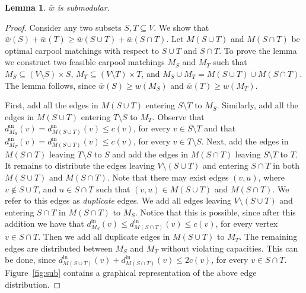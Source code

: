\documentclass[11pt]{article}
\newtheorem{lemma}{Lemma}
\newcommand{\din}[1][M]{d^{\text{in}}_{#1}}
\newcommand{\barw}{\bar{w}}
\begin{document}
\begin{lemma}
$\barw$ is submodular.
\end{lemma}
\begin{proof}
Consider any two subsets $S, T \subseteq V$.  We show that $\barw(S)
+ \barw(T) \geq \barw(S \cup T) + \barw(S \cap T)$.
%
Let $M(S \cup T)$ and $M(S \cap T)$ be optimal carpool matchings with
respect to $S \cup T$ and $S \cap T$.
%
To prove the lemma we construct two feasible carpool matchings $M_S$
and $M_T$ such that $M_S \subseteq (V \setminus S) \times S$,
$M_T \subseteq (V \setminus T) \times T$, and $M_S \cup M_T = M(S \cup
T) \cup M(S \cap T)$.
%
The lemma follows, since $\barw(S) \geq w(M_S)$ and $\barw(T) \geq
w(M_T)$.

First, add all the edges in $M(S \cup T)$ entering $S \setminus T$ to
$M_S$.  Similarly, add all the edges in $M(S \cup T)$ entering
$T \setminus S$ to $M_T$.  Observe that $\din[M_S](v) = \din[M(S \cup
T)](v) \leq c(v)$, for every $v \in S \setminus T$ and that
$\din[M_T](v) = \din[M(S \cup T)](v) \leq c(v)$, for every $v \in
T \setminus S$.
%
Next, add the edges in $M(S \cap T)$ leaving $T \setminus S$ to $S$
and add the edges in $M(S \cap T)$ leaving $S \setminus T$ to $T$.
%
It remains to distribute the edges leaving $V \setminus (S \cup T)$
and entering $S \cap T$ in both $M(S \cup T)$ and $M(S \cap T)$.  Note
that there may exist edges $(v,u)$, where $v \not\in S \cup T$, and
$u \in S \cap T$ such that $(v,u) \in M(S \cup T)$ and $M(S \cap T)$.
We refer to this edges as \emph{duplicate} edges.
%
We add all edges leaving $V \setminus (S \cup T)$ and entering $S \cap
T$ in $M(S \cap T)$ to $M_S$.  Notice that this is possible, since
after this addition we have that $\din[M_S](v) \leq \din[M(S \cap
T)](v) \leq c(v)$, for every vertex $v \in S \cap T$.
%
Then we add all duplicate edges in $M(S \cup T)$ to $M_T$.
%
The remaining edges are distributed between $M_S$ and $M_T$ without
violating capacities.  This can be done, since $\din[M(S \cup T)](v)
+ \din[M(S \cap T)](v) \leq 2c(v)$, for every $v \in S \cap T$.
%
Figure~\ref{fig:sub} contains a graphical representation of the above
edge distribution.
\end{proof}
\end{document}
